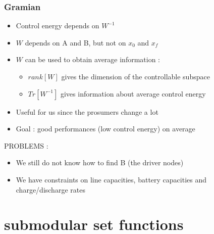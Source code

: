 \documentclass[xcolor=dvipsnames]{beamer}
\begin{document}
\begin{frame}
	\frametitle{Gramian}
	
	\begin{itemize}
		\item Control energy depends on $W^{-1}$
		\item $W$ depends on A and B, but not on $x_0$ and $x_f$
		\item $W$ can be used to obtain average information :
		\begin{itemize}
			\item $rank[W] $ gives the dimension of the controllable subspace
			\item $Tr[W^{-1}]$ gives information about average control energy
		\end{itemize}
		\item Useful for us since the prosumers change a lot
		\item Goal : good performances (low control energy) on average
	\end{itemize}
	PROBLEMS :
	\begin{itemize}
		\item We still do not know how to find B (the driver nodes)
		\item We have constraints on line capacities, battery capacities and charge/discharge rates
	\end{itemize}
\end{frame}

\section{submodular set functions}
\begin{frame}
	\tableofcontents[currentsection]
\end{frame}
\end{document}
